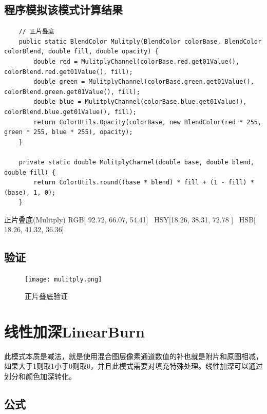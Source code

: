 \subsection{ 程序模拟该模式计算结果}

\begin{lstlisting}
	// 正片叠底
	public static BlendColor Mulitply(BlendColor colorBase, BlendColor colorBlend, double fill, double opacity) {
		double red = MulitplyChannel(colorBase.red.get01Value(), colorBlend.red.get01Value(), fill);
		double green = MulitplyChannel(colorBase.green.get01Value(), colorBlend.green.get01Value(), fill);
		double blue = MulitplyChannel(colorBase.blue.get01Value(), colorBlend.blue.get01Value(), fill);
		return ColorUtils.Opacity(colorBase, new BlendColor(red * 255, green * 255, blue * 255), opacity);
	}
	
	private static double MulitplyChannel(double base, double blend, double fill) {
		return ColorUtils.round((base * blend) * fill + (1 - fill) * (base), 1, 0);
	}
\end{lstlisting}



\begin{result}
\item 正片叠底(Mulitply)      RGB[ 92.72,  66.07,  54.41]~ HSY[18.26,  38.31,  72.78 ]~ HSB[ 18.26,  41.32,  36.36]
\end{result}

\subsection{ 验证}

\begin{figure}[!htb]
	\centering
	\texttt{[image: mulitply.png]}
		\caption{正片叠底验证}
	\label{fig:}
\end{figure}
%
%
%
\newpage
\section{ 线性加深LinearBurn}

此模式本质是减法，就是使用混合图层像素通道数值的补也就是附片和原图相减，如果大于1则取1小于0则取0，并且此模式需要对填充特殊处理。线性加深可以通过划分和颜色加深转化。

\subsection{ 公式}



